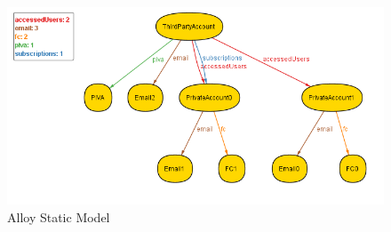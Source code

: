 \documentclass[titlepage]{article}
\begin{document}
		\begin{figure}[H]
			\center
  			\includegraphics[width=\textwidth]{Alloy/staticModel.png}
  			\caption{Alloy Static Model}
 			\label{fig:staticModel}
		\end{figure}
	
\end{document}
